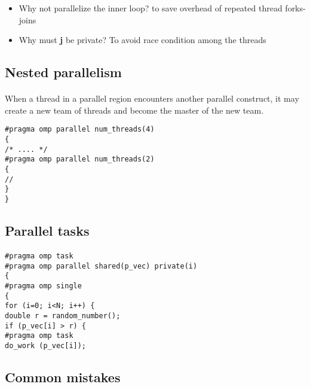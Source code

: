\documentclass[%
oneside,                 %
final,                   %
10pt]{article}
\begin{document}
\begin{itemize}
\item Why not parallelize the inner loop? to save overhead of repeated thread forks-joins

\item Why must \textbf{j} be private? To avoid race condition among the threads
\end{itemize}

\noindent




\subsection*{Nested parallelism}

\paragraph{}
When a thread in a parallel region encounters another parallel construct, it
may create a new team of threads and become the master of the new
team.
\begin{verbatim}
#pragma omp parallel num_threads(4)
{
/* .... */
#pragma omp parallel num_threads(2)
{
//  
}
}
\end{verbatim}




\subsection*{Parallel tasks}

\paragraph{}
\begin{verbatim}
#pragma omp task 
#pragma omp parallel shared(p_vec) private(i)
{
#pragma omp single
{
for (i=0; i<N; i++) {
double r = random_number();
if (p_vec[i] > r) {
#pragma omp task
do_work (p_vec[i]);
\end{verbatim}




\subsection*{Common mistakes}
\end{document}
